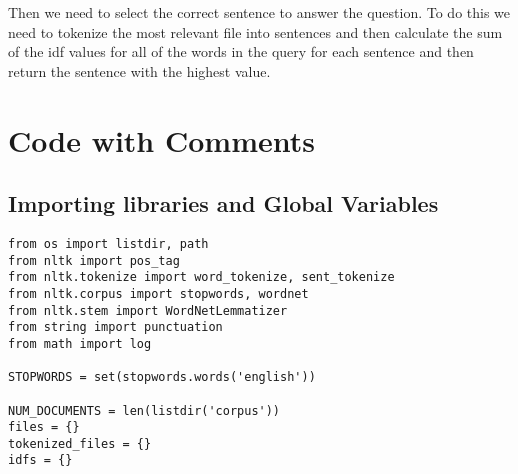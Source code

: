 \documentclass{article}
\begin{document}
Then we need to select the correct sentence to answer the question. To do this we need to tokenize the most relevant file into sentences and then calculate the sum of the idf values for all of the words in the query for each sentence and then return the sentence with the highest value.
\section{Code with Comments}
\subsection{Importing libraries and Global Variables}
\begin{verbatim}
from os import listdir, path
from nltk import pos_tag
from nltk.tokenize import word_tokenize, sent_tokenize
from nltk.corpus import stopwords, wordnet
from nltk.stem import WordNetLemmatizer
from string import punctuation
from math import log

STOPWORDS = set(stopwords.words('english'))

NUM_DOCUMENTS = len(listdir('corpus'))
files = {}
tokenized_files = {}
idfs = {}
\end{verbatim}
\end{document}
